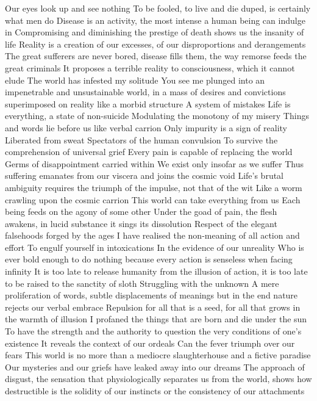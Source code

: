 \documentclass{article}
\begin{document}
Our eyes look up and see nothing
To be fooled, to live and die duped, is certainly what men do
Disease is an activity, the most intense a human being can indulge in
Compromising and diminishing the prestige of death shows us the insanity of life
Reality is a creation of our excesses, of our disproportions and derangements
The great sufferers are never bored, disease fills them, the way remorse feeds the great criminals
It proposes a terrible reality to consciousness, which it cannot elude
The world has infested my solitude
You see me plunged into an impenetrable and unsustainable world, in a mass of desires and convictions superimposed on reality like a morbid structure
A system of mistakes
Life is everything, a state of non-suicide
Modulating the monotony of my misery
Things and words lie before us like verbal carrion
Only impurity is a sign of reality
Liberated from sweat
Spectators of the human convulsion
To survive the comprehension of universal grief
Every pain is capable of replacing the world
Germs of disappointment carried within
We exist only insofar as we suffer
Thus suffering emanates from our viscera and joins the cosmic void
Life's brutal ambiguity requires the triumph of the impulse, not that of the wit
Like a worm crawling upon the cosmic carrion
This world can take everything from us
Each being feeds on the agony of some other
Under the goad of pain, the flesh awakens, in lucid substance it sings its dissolution
Respect of the elegant falsehoods forged by the ages
I have realised the non-meaning of all action and effort
To engulf yourself in intoxications
In the evidence of our unreality
Who is ever bold enough to do nothing because every action is senseless when facing infinity
It is too late to release humanity from the illusion of action, it is too late to be raised to the sanctity of sloth
Struggling with the unknown
A mere proliferation of words, subtle displacements of meanings but in the end nature rejects our verbal embrace
Repulsion for all that is a seed, for all that grows in the warmth of illusion
I profaned the things that are born and die under the sun
To have the strength and the authority to question the very conditions of one's existence
It reveals the context of our ordeals
Can the fever triumph over our fears
This world is no more than a mediocre slaughterhouse and a fictive paradise
Our mysteries and our griefs have leaked away into our dreams
The approach of disgust, the sensation that physiologically separates us from the world, shows how destructible is the solidity of our instincts or the consistency of our attachments
\end{document}
